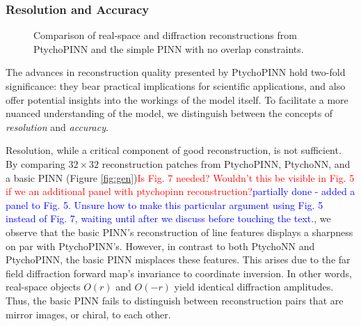 \documentclass[sn-mathphys]{sn-jnl}%
\theoremstyle{thmstyleone}%
\theoremstyle{thmstyletwo}%
\theoremstyle{thmstylethree}%
\begin{document}
\subsubsection{Resolution and Accuracy}

\begin{figure}
    \centering
    \caption{Comparison of real-space and diffraction reconstructions from PtychoPINN and the simple PINN with no overlap constraints.}%
    \label{fig:patches}
\end{figure}

 The advances in reconstruction quality presented by PtychoPINN hold two-fold significance: they bear practical implications for scientific applications, and also offer potential insights into the workings of the model itself. To facilitate a more nuanced understanding of the model, we distinguish between the concepts of \emph{resolution} and \emph{accuracy}.

Resolution, while a critical component of good reconstruction, is not sufficient. By comparing $32 \times 32$ reconstruction patches from PtychoPINN, PtychoNN, and a basic PINN (Figure \ref{fig:gen})\textcolor{red}{Is Fig. 7 needed?  Wouldn't this be visible in Fig. 5 if we an additional panel with ptychopinn reconstruction?}\textcolor{blue}{partially done - added a panel to Fig. 5. Unsure how to make this particular argument using Fig. 5 instead of Fig. 7, waiting until after we discuss before touching the text.}, we observe that the basic PINN's reconstruction of line features displays a sharpness on par with PtychoPINN's. However, in contrast to both PtychoNN and PtychoPINN, the basic PINN misplaces these features. This arises due to the far field diffraction forward map's invariance to coordinate inversion.  In other words, real-space objects $O(r)$ and $O(-r)$ yield identical diffraction amplitudes. Thus, the basic PINN fails to distinguish between reconstruction pairs that are mirror images, or chiral, to each other.


\end{document}
